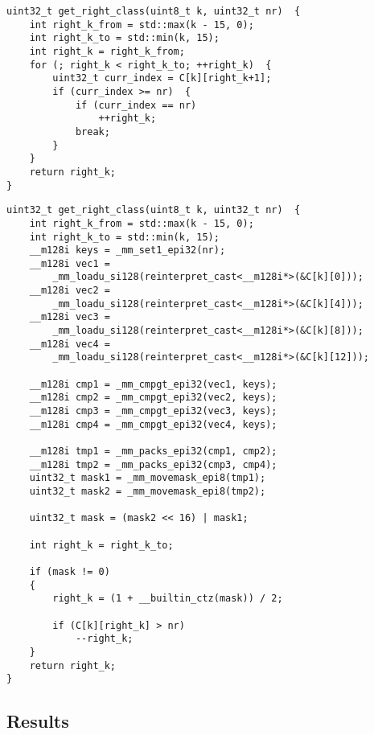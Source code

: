 \begin{lstlisting}
uint32_t get_right_class(uint8_t k, uint32_t nr)  {
	int right_k_from = std::max(k - 15, 0);
	int right_k_to = std::min(k, 15);
	int right_k = right_k_from;
	for (; right_k < right_k_to; ++right_k)  {
		uint32_t curr_index = C[k][right_k+1];
		if (curr_index >= nr)  {
			if (curr_index == nr)
				++right_k;
			break;
		}
	}
	return right_k;
}
\end{lstlisting}

\begin{lstlisting}
uint32_t get_right_class(uint8_t k, uint32_t nr)  {
	int right_k_from = std::max(k - 15, 0);
	int right_k_to = std::min(k, 15);
	__m128i keys = _mm_set1_epi32(nr);
	__m128i vec1 =
		_mm_loadu_si128(reinterpret_cast<__m128i*>(&C[k][0]));
	__m128i vec2 =
		_mm_loadu_si128(reinterpret_cast<__m128i*>(&C[k][4]));
	__m128i vec3 =
		_mm_loadu_si128(reinterpret_cast<__m128i*>(&C[k][8]));
	__m128i vec4 =
		_mm_loadu_si128(reinterpret_cast<__m128i*>(&C[k][12]));

	__m128i cmp1 = _mm_cmpgt_epi32(vec1, keys);
	__m128i cmp2 = _mm_cmpgt_epi32(vec2, keys);
	__m128i cmp3 = _mm_cmpgt_epi32(vec3, keys);
	__m128i cmp4 = _mm_cmpgt_epi32(vec4, keys);

	__m128i tmp1 = _mm_packs_epi32(cmp1, cmp2);
	__m128i tmp2 = _mm_packs_epi32(cmp3, cmp4);
	uint32_t mask1 = _mm_movemask_epi8(tmp1);
	uint32_t mask2 = _mm_movemask_epi8(tmp2);

	uint32_t mask = (mask2 << 16) | mask1;

	int right_k = right_k_to;

	if (mask != 0)
	{
		right_k = (1 + __builtin_ctz(mask)) / 2;

		if (C[k][right_k] > nr)
			--right_k;
	}
	return right_k;
}
\end{lstlisting}

\subsection{Results}

